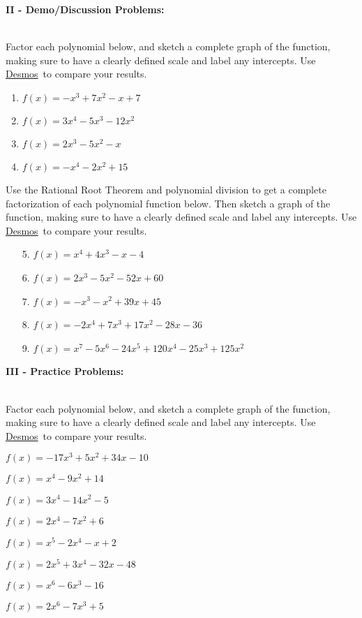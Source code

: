 \documentclass[12pt]{article}
\theoremstyle{definition}
\newcommand{\Desmos}{\href{https://www.desmos.com/}{Desmos}}
\begin{document}
{\bf II - Demo/Discussion Problems:}\\
\ \par
Factor each polynomial below, and sketch a complete graph of the function, making sure to have a clearly defined scale and label any intercepts.  Use \Desmos \ to compare your results.
\begin{enumerate}
	\item $f(x) = -x^{3} + 7x^{2} - x + 7$
	\item $f(x) = 3x^4 - 5x^3 - 12x^2$
	\item $f(x) = 2x^3 - 5x^2 - x$
	\item $f(x) = -x^4-2x^2 +15$
\end{enumerate}
\newpage
Use the Rational Root Theorem and polynomial division to get a complete factorization of each polynomial function below.  Then sketch a graph of the function, making sure to have a clearly defined scale and label any intercepts.  Use \Desmos \ to compare your results.
\begin{enumerate}
	\item[5.] $f(x) = x^4+4x^3-x-4$	
	\item[6.] $f(x) = 2x^3-5x^2-52x+60$
	\item[7.] $f(x) = -x^3-x^2+39x+45$
	\item[8.] $f(x) = -2x^4+7x^3+17x^2-28x-36$
	\item[9.] $f(x) = x^7-5x^6-24x^5+120x^4-25x^3+125x^2$\\
\end{enumerate}
{\bf III - Practice Problems:}\\
\ \par
Factor each polynomial below, and sketch a complete graph of the function, making sure to have a clearly defined scale and label any intercepts.  Use \Desmos \ to compare your results.
\begin{enumerate}
\begin{multicols}{2}
	\item $f(x) = -17x^{3} + 5x^{2} + 34x - 10$
	\item $f(x) = x^4-9x^2+14$
	\item $f(x) = 3x^4-14x^2-5$
	\item $f(x) = 2x^4-7x^2+6$
	\item $f(x) = x^5-2x^4-x+2$
	\item $f(x) = 2x^5+3x^4-32x-48$
	\item $f(x) = x^6-6x^3-16$
	\item $f(x) = 2x^6-7x^3+5$
\end{multicols}
\end{enumerate}
\end{document}
